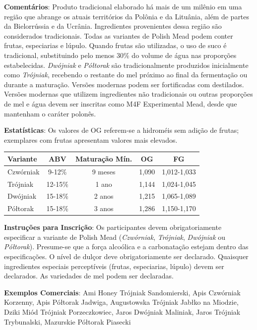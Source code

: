 \textbf{Comentários}: Produto tradicional elaborado há mais de um milênio em uma região que abrange os atuais territórios da Polônia e da Lituânia, além de partes da Bielorrússia e da Ucrânia. Ingredientes provenientes dessa região são considerados tradicionais. Todas as variantes de Polish Mead podem conter frutas, especiarias e lúpulo. Quando frutas são utilizadas, o uso de suco é tradicional, substituindo pelo menos 30\% do volume de água nas proporções estabelecidas. \textit{Dwójniak} e \textit{Półtorak} são tradicionalmente produzidos inicialmente como \textit{Trójniak}, recebendo o restante do mel próximo ao final da fermentação ou durante a maturação. Versões modernas podem ser fortificadas com destilados. Versões modernas que utilizem ingredientes não tradicionais ou outras proporções de mel e água devem ser inscritas como M4F Experimental Mead, desde que mantenham o caráter polonês.

\textbf{Estatísticas}: Os valores de OG referem-se a hidroméis sem adição de frutas; exemplares com frutas apresentam valores mais elevados.

\begin{center}
\footnotesize
\begin{tabular}{lcccc}
\toprule
Variante & ABV & Maturação Mín. & OG & FG \\
\midrule
Czwórniak & 9-12\% & 9 meses & 1,090 & 1,012-1,033 \\
Trójniak & 12-15\% & 1 ano & 1,144 & 1,024-1,045 \\
Dwójniak & 15-18\% & 2 anos & 1,215 & 1,065-1,089 \\
Półtorak & 15-18\% & 3 anos & 1,286 & 1,150-1,170 \\
\bottomrule
\end{tabular}
\end{center}

\textbf{Instruções para Inscrição}: Os participantes devem obrigatoriamente especificar a variante de Polish Mead (\textit{Czwórniak}, \textit{Trójniak}, \textit{Dwójniak} ou \textit{Półtorak}). Presume-se que a força alcoólica e a carbonatação estejam dentro das especificações. O nível de dulçor deve obrigatoriamente ser declarado. Quaisquer ingredientes especiais perceptíveis (frutas, especiarias, lúpulo) devem ser declarados. As variedades de mel podem ser declaradas.

\textbf{Exemplos Comerciais}: Ami Honey Trójniak Sandomierski, Apis Czwórniak Korzenny, Apis Półtorak Jadwiga, Augustowska Trójniak Jabłko na Miodzie, Dziki Miód Trójniak Porzeczkowiec, Jaros Dwójniak Maliniak, Jaros Trójniak Trybunalski, Mazurskie Półtorak Piasecki